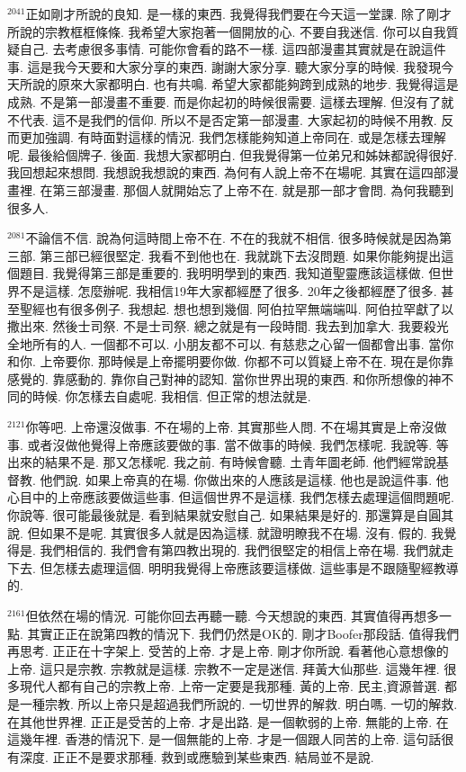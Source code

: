 \documentclass{book}
\begin{document}
$^{2041}$正如剛才所說的良知.
是一樣的東西.
我覺得我們要在今天這一堂課.
除了剛才所說的宗教框框條條.
我希望大家抱著一個開放的心.
不要自我迷信.
你可以自我質疑自己.
去考慮很多事情.
可能你會看的路不一樣.
這四部漫畫其實就是在說這件事.
這是我今天要和大家分享的東西.
謝謝大家分享.
聽大家分享的時候.
我發現今天所說的原來大家都明白.
也有共鳴.
希望大家都能夠跨到成熟的地步.
我覺得這是成熟.
不是第一部漫畫不重要.
而是你起初的時候很需要.
這樣去理解.
但沒有了就不代表.
這不是我們的信仰.
所以不是否定第一部漫畫.
大家起初的時候不用教.
反而更加強調.
有時面對這樣的情況.
我們怎樣能夠知道上帝同在.
或是怎樣去理解呢.
最後給個牌子.
後面.
我想大家都明白.
但我覺得第一位弟兄和姊妹都說得很好.
我回想起來想問.
我想說我想說的東西.
為何有人說上帝不在場呢.
其實在這四部漫畫裡.
在第三部漫畫.
那個人就開始忘了上帝不在.
就是那一部才會問.
為何我聽到很多人.

$^{2081}$不論信不信.
說為何這時間上帝不在.
不在的我就不相信.
很多時候就是因為第三部.
第三部已經很堅定.
我看不到他也在.
我就跳下去沒問題.
如果你能夠提出這個題目.
我覺得第三部是重要的.
我明明學到的東西.
我知道聖靈應該這樣做.
但世界不是這樣.
怎麼辦呢.
我相信19年大家都經歷了很多.
20年之後都經歷了很多.
甚至聖經也有很多例子.
我想起.
想也想到幾個.
阿伯拉罕無端端叫.
阿伯拉罕獻了以撒出來.
然後士司祭.
不是士司祭.
總之就是有一段時間.
我去到加拿大.
我要殺光全地所有的人.
一個都不可以.
小朋友都不可以.
有慈悲之心留一個都會出事.
當你和你.
上帝要你.
那時候是上帝擺明要你做.
你都不可以質疑上帝不在.
現在是你靠感覺的.
靠感動的.
靠你自己對神的認知.
當你世界出現的東西.
和你所想像的神不同的時候.
你怎樣去自處呢.
我相信.
但正常的想法就是.

$^{2121}$你等吧.
上帝還沒做事.
不在場的上帝.
其實那些人問.
不在場其實是上帝沒做事.
或者沒做他覺得上帝應該要做的事.
當不做事的時候.
我們怎樣呢.
我說等.
等出來的結果不是.
那又怎樣呢.
我之前.
有時候會聽.
土青年圖老師.
他們經常說基督教.
他們說.
如果上帝真的在場.
你做出來的人應該是這樣.
他也是說這件事.
他心目中的上帝應該要做這些事.
但這個世界不是這樣.
我們怎樣去處理這個問題呢.
你說等.
很可能最後就是.
看到結果就安慰自己.
如果結果是好的.
那還算是自圓其說.
但如果不是呢.
其實很多人就是因為這樣.
就證明瞭我不在場.
沒有.
假的.
我覺得是.
我們相信的.
我們會有第四教出現的.
我們很堅定的相信上帝在場.
我們就走下去.
但怎樣去處理這個.
明明我覺得上帝應該要這樣做.
這些事是不跟隨聖經教導的.

$^{2161}$但依然在場的情況.
可能你回去再聽一聽.
今天想說的東西.
其實值得再想多一點.
其實正正在說第四教的情況下.
我們仍然是OK的.
剛才Boofer那段話.
值得我們再思考.
正正在十字架上.
受苦的上帝.
才是上帝.
剛才你所說.
看著他心意想像的上帝.
這只是宗教.
宗教就是這樣.
宗教不一定是迷信.
拜黃大仙那些.
這幾年裡.
很多現代人都有自己的宗教上帝.
上帝一定要是我那種.
黃的上帝.
民主,資源普選.
都是一種宗教.
所以上帝只是超過我們所說的.
一切世界的解救.
明白嗎.
一切的解救.
在其他世界裡.
正正是受苦的上帝.
才是出路.
是一個軟弱的上帝.
無能的上帝.
在這幾年裡.
香港的情況下.
是一個無能的上帝.
才是一個跟人同苦的上帝.
這句話很有深度.
正正不是要求那種.
救到或應驗到某些東西.
結局並不是說.
\end{document}
